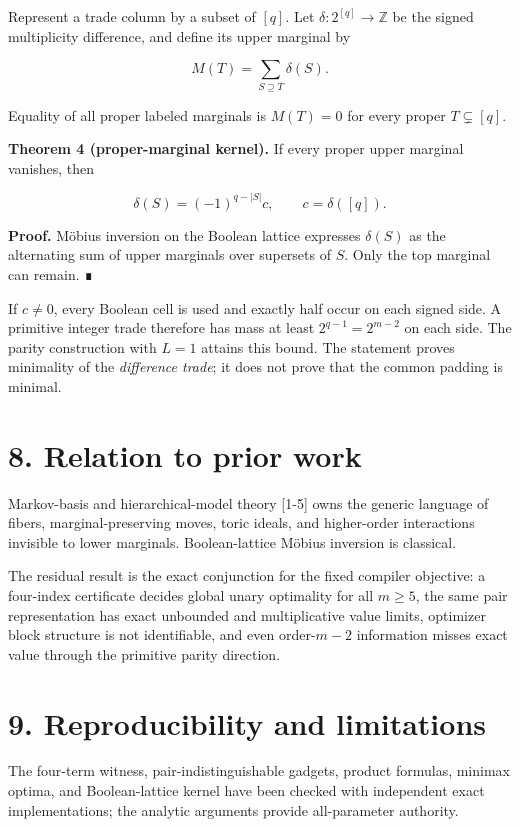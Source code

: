 \documentclass[
  11pt,
]{article}
\begin{document}
Represent a trade column by a subset of \([q]\). Let
\(\delta:2^{[q]}\to\mathbb Z\) be the signed multiplicity difference,
and define its upper marginal by

\[
M(T)=\sum_{S\supseteq T}\delta(S).
\]

Equality of all proper labeled marginals is \(M(T)=0\) for every proper
\(T\subsetneq[q]\).

\textbf{Theorem 4 (proper-marginal kernel).} If every proper upper
marginal vanishes, then

\[
\delta(S)=(-1)^{q-|S|}c,
\qquad c=\delta([q]).
\]

\textbf{Proof.} Möbius inversion on the Boolean lattice expresses
\(\delta(S)\) as the alternating sum of upper marginals over supersets
of \(S\). Only the top marginal can remain. ∎

If \(c\ne0\), every Boolean cell is used and exactly half occur on each
signed side. A primitive integer trade therefore has mass at least
\(2^{q-1}=2^{m-2}\) on each side. The parity construction with \(L=1\)
attains this bound. The statement proves minimality of the
\emph{difference trade}; it does not prove that the common padding is
minimal.

\hypertarget{relation-to-prior-work}{%
\section{8. Relation to prior work}\label{relation-to-prior-work}}

Markov-basis and hierarchical-model theory {[}1-5{]} owns the generic
language of fibers, marginal-preserving moves, toric ideals, and
higher-order interactions invisible to lower marginals. Boolean-lattice
Möbius inversion is classical.

The residual result is the exact conjunction for the fixed compiler
objective: a four-index certificate decides global unary optimality for
all \(m\ge5\), the same pair representation has exact unbounded and
multiplicative value limits, optimizer block structure is not
identifiable, and even order-\(m-2\) information misses exact value
through the primitive parity direction.

\hypertarget{reproducibility-and-limitations}{%
\section{9. Reproducibility and
limitations}\label{reproducibility-and-limitations}}

The four-term witness, pair-indistinguishable gadgets, product formulas,
minimax optima, and Boolean-lattice kernel have been checked with
independent exact implementations; the analytic arguments provide
all-parameter authority.
\end{document}
